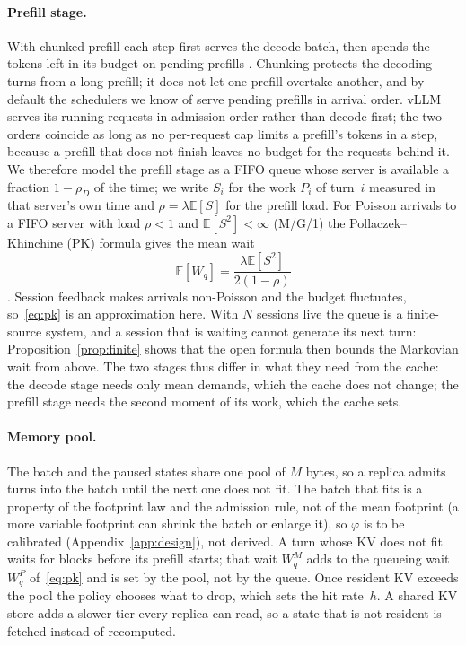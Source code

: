\documentclass{article}
\newcommand{\leanref}[1]{}
\newcommand{\provedby}[1]{}
\theoremstyle{plain}
\theoremstyle{definition}
\theoremstyle{remark}
\newcommand{\E}{\mathbb{E}}
\begin{document}
\paragraph{Prefill stage.} With chunked prefill each step first serves
the decode batch, then spends the tokens left in its budget on pending
prefills \citep{sarathi2024}. Chunking protects the decoding turns from
a long prefill; it does not let one prefill overtake another, and by
default the schedulers we know of serve pending prefills in arrival
order. vLLM serves its running requests in admission order rather than
decode first; the two orders coincide as long as no per-request cap
limits a prefill's tokens in a step, because a prefill that does not
finish leaves no budget for the requests behind
it.\provedby{\leanref{serve\_preserves\_shape}, \leanref{serve\_eq\_decode\_first}, \leanref{chunk\_cap\_breaks\_shape}}
We therefore model the prefill
stage as a FIFO queue whose server is available a fraction $1-\rho_D$
of the time; we write $S_i$ for the work $P_i$ of turn~$i$ measured in
that server's own time and $\rho=\lambda\E[S]$ for the prefill load.
For Poisson arrivals to a FIFO server with load $\rho<1$ and
$\E[S^2]<\infty$ (M/G/1) the Pollaczek--Khinchine (PK) formula gives
the mean wait
\begin{equation}\label{eq:pk}
  \E[W_q] = \frac{\lambda \E[S^2]}{2(1-\rho)}
\end{equation}
\citep{pollaczek1930,khinchine1932}. Session feedback makes arrivals
non-Poisson and the budget fluctuates, so~\eqref{eq:pk} is an
approximation here. With $N$ sessions live the queue is a finite-source
system, and a session that is waiting cannot generate its next turn:
Proposition~\ref{prop:finite} shows that the open formula then bounds
the Markovian wait from above. The two stages thus differ in what they need
from the cache: the decode stage needs only mean demands, which the
cache does not change; the prefill stage needs the second moment of its
work, which the cache sets.

\paragraph{Memory pool.} The batch and the paused states share one
pool of $M$ bytes, so a replica admits turns into the batch until the
next one does not fit. The batch that fits is a property of the
footprint law and the admission rule, not of the mean footprint (a
more variable footprint can shrink the batch or enlarge
it),\provedby{\leanref{footprint\_variance\_hurts}, \leanref{footprint\_variance\_helps}}
so $\varphi$ is to be calibrated (Appendix~\ref{app:design}), not
derived.
A turn whose KV does not fit waits for blocks before its prefill
starts; that wait $W_q^M$ adds to the queueing wait $W_q^P$
of~\eqref{eq:pk} and is set by the pool, not by the queue. Once resident KV exceeds the pool the policy chooses
what to drop, which sets the hit rate~$h$. A shared KV store \citep{mooncake-vllm}
adds a slower tier every replica can read, so a state that is not
resident is fetched instead of recomputed.
\end{document}
